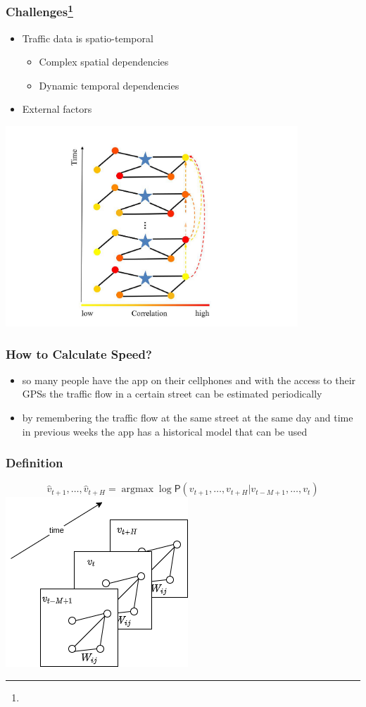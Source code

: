\documentclass{beamer}
\begin{document}
\begin{frame}
  \frametitle{Challenges\footnote{}}
  \begin{itemize}
    \item Traffic data is spatio-temporal
          \begin{itemize}
            \item Complex spatial dependencies
            \item Dynamic temporal dependencies
          \end{itemize}
    \item External factors
  \end{itemize}
  \centering
  \includegraphics[height=0.5\textheight]{./img/correlations.png}
\end{frame}
\begin{frame}
  \frametitle{How to Calculate Speed?}
  \begin{itemize}
    \item so many people have the app on their cellphones and with the access to their GPSs the traffic flow in a certain street can be estimated periodically
    \item by remembering the traffic flow at the same street at the same day and time in previous weeks the app has a historical model that can be used
  \end{itemize}
\end{frame}
\begin{frame}
  \frametitle{Definition}
  \begin{equation}
    \label{eq:base}
    \hat{v}_{t+1}, \ldots,  \hat{v}_{t+H} = \mathop{\mathrm{argmax}} \log \mathsf{P}({v}_{t+1}, \ldots,  v_{t+H} | v_{t-M+1} , \ldots,  v_{t})
  \end{equation}
  \centering
  \includegraphics[height=.5\textheight]{img/base.png}
\end{frame}
\end{document}
